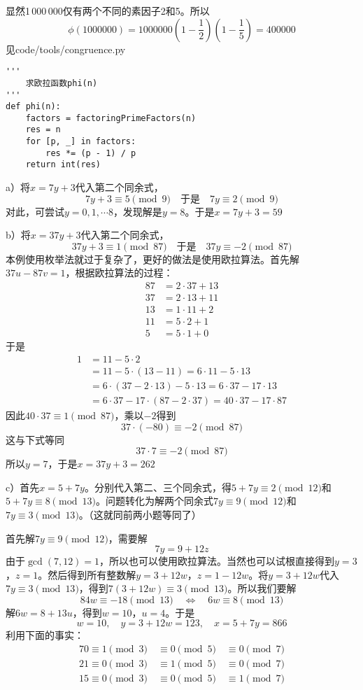 显然1\,000\,000仅有两个不同的素因子2和5。所以
\[\phi(1000000)=1000000\left(1-\frac{1}{2}\right)\left(1-\frac{1}{5}\right)=400000\]
%
\exercise 见code/tools/congruence.py
\begin{lstlisting}
'''
    求欧拉函数phi(n)
'''
def phi(n):
    factors = factoringPrimeFactors(n)
    res = n
    for [p, _] in factors:
        res *= (p - 1) / p
    return int(res)
\end{lstlisting}
%
\exercise a）将$x=7y+3$代入第二个同余式，
\[7y+3\equiv 5\pmod 9\quad \text{于是} \quad 7y\equiv2\pmod9\]
对此，可尝试$y=0,1,\cdots8$，发现解是$y=8$。于是$x=7y+3=59$\par
b）将$x=37y+3$代入第二个同余式，
\[37y+3\equiv 1\pmod {87}\quad \text{于是} \quad 37y\equiv-2\pmod{87}\]
本例使用枚举法就过于复杂了，更好的做法是使用欧拉算法。首先解$37u-87v=1$，根据欧拉算法的过程：
\begin{align*}
87&= 2\cdot37+13 \\
37&= 2\cdot13+11 \\
13&= 1\cdot11+2 \\
11&= 5\cdot2+1 \\
5&=5\cdot1 + 0
\end{align*}
于是
\begin{align*}
1&= 11 - 5\cdot2 \\
&= 11 - 5\cdot(13-11) = 6\cdot11-5\cdot13 \\
&= 6\cdot(37-2\cdot13)-5\cdot13 = 6\cdot37-17\cdot13 \\
&= 6\cdot37-17\cdot(87-2\cdot37)=40\cdot37-17\cdot87 
\end{align*}
因此$40\cdot37\equiv 1\pmod{87}$，乘以$-2$得到
\[37\cdot(-80)\equiv -2\pmod{87}\]
这与下式等同
\[37\cdot7\equiv -2\pmod{87}\]
所以$y=7$，于是$x=37y+3=262$\par
c）首先$x = 5+7y$。分别代入第二、三个同余式，得$5+7y\equiv2\pmod{12}$和$5+7y\equiv8\pmod{13}$。问题转化为解两个同余式$7y\equiv9\pmod{12}$和$7y\equiv3\pmod{13}$。（这就同前两小题等同了）\par
首先解$7y\equiv9\pmod{12}$，需要解
\[7y=9+12z\]
由于$\gcd(7,12) = 1$，所以也可以使用欧拉算法。当然也可以试根直接得到$y=3$，$z=1$。然后得到所有整数解$y=3+12w$，$z=1-12w$。将$y=3+12w$代入$7y\equiv3\pmod{13}$，得到$7(3+12w)\equiv3\pmod{13}$。所以我们要解
\[84w\equiv-18\pmod{13}\quad \Leftrightarrow\quad 6w\equiv8\pmod{13}\]
解$6w=8+13u$，得到$w=10$，$u=4$。于是
\[w=10,\quad y=3+12w=123,\quad x=5+7y=866\]
%
\exercise 利用下面的事实：
\begin{gather*}
70\equiv 1\pmod3\quad \equiv0\pmod5\quad \equiv0\pmod7 \\
21\equiv 0\pmod3\quad \equiv1\pmod5\quad \equiv0\pmod7 \\
15\equiv 0\pmod3\quad \equiv0\pmod5\quad \equiv1\pmod7
\end{gather*}
